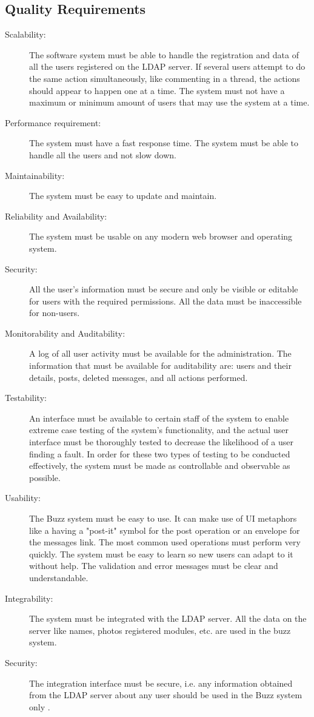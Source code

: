 \documentclass[hidelinks, 12pt]{article}
\begin{document}
\subsection{Quality Requirements}
\begin{description}
  \item[Scalability:] 
        The software system must be able to handle the registration and data of all the users registered on the LDAP server. 
       If several users attempt to do the same action simultaneously, like commenting in a thread, the actions should appear to happen one at a time. 
      The system must not have a maximum or minimum amount of users that may use the system at a time.
  \item[Performance requirement:]
      The system must have a fast response time. The system must be able to handle all the users and not slow down.
  \item[Maintainability:] 
      The system must be easy to update and maintain.
  \item[Reliability and Availability:]
      The system must be usable on any modern web browser and operating system.
  \item[Security:]
      All the user's information must be secure and only be visible or editable for users with the required permissions. All the data must be inaccessible for non-users.
  \item[Monitorability and Auditability:]
      A log of all user activity must be available for the administration. The information that must be available for auditability are: users and their details, posts, deleted messages, and all actions performed.
  \item[Testability:]
      An interface must be available to certain staff of the system to enable extreme case testing of the system's functionality, and the actual user interface must be thoroughly tested to decrease the likelihood of a user finding a fault. In order for these two types of testing to be conducted effectively, the system must be made as controllable and observable as possible.
  \item[Usability:]
      The Buzz system must be easy to use. It can make use of UI metaphors like a having a "post-it" symbol for the post operation or an envelope for the messages link.
      The most common used operations must perform very quickly. The system must be easy to learn so new users can adapt to it without help. 
      The validation and error messages must be clear and understandable.
  \item[Integrability:]
      The system must be integrated with the LDAP server. 
      All the data on the server like names, photos registered modules, etc. are used in the buzz system. 
\item[Security:]
The integration interface must be secure, i.e. any information obtained from the LDAP server about any user should be used in the Buzz system only .
\end{description}
\end{document}
